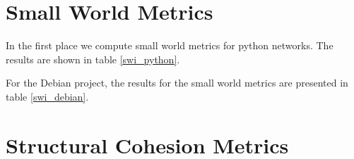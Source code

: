 \section{Small World Metrics}

In the first place we compute small world metrics for python networks. The results are shown in table \ref{swi_python}.



For the Debian project, the results for the small world metrics are presented in table \ref{swi_debian}.




\section{Structural Cohesion Metrics}






